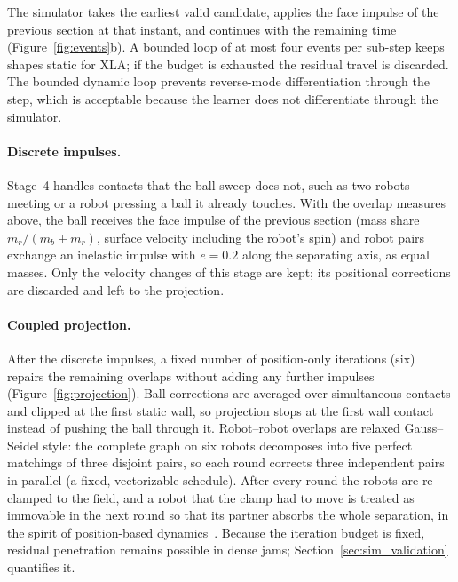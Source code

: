 The simulator takes the earliest valid candidate, applies the face impulse of the
previous section at that instant, and continues with the remaining time (Figure~\ref{fig:events}b).  A bounded loop
of at most four events per sub-step keeps shapes static for XLA; if the budget is exhausted
the residual travel is discarded.  The bounded dynamic loop prevents reverse-mode
differentiation through the step, which is acceptable because the learner does not
differentiate through the simulator.




\paragraph{Discrete impulses.}
Stage~4 handles contacts that the ball sweep does not, such as two robots meeting or a robot
pressing a ball it already touches.  With the overlap measures above, the ball receives the face
impulse of the previous section (mass share $m_r/(m_b+m_r)$, surface velocity including the robot's
spin) and robot pairs exchange an inelastic impulse with $e=0.2$ along the separating axis, as
equal masses.  Only the velocity changes of this stage are kept; its positional corrections are
discarded and left to the projection.

\paragraph{Coupled projection.}
After the discrete impulses, a fixed number of position-only iterations (six) repairs the
remaining overlaps without adding any further impulses (Figure~\ref{fig:projection}).  Ball corrections are averaged over
simultaneous contacts and clipped at the first static wall, so projection stops at the first wall contact instead of pushing
the ball through it.  Robot--robot overlaps are relaxed Gauss--Seidel style: the complete
graph on six robots decomposes into five perfect matchings of three disjoint pairs, so each
round corrects three independent pairs in parallel (a fixed, vectorizable schedule).  After
every round the robots are re-clamped to the field, and a robot that the clamp had to move is
treated as immovable in the next round so that its partner absorbs the whole separation, in the
spirit of position-based dynamics~\cite{muller2007pbd}.  Because the iteration budget is fixed,
residual penetration remains possible in dense jams; Section~\ref{sec:sim_validation} quantifies it.

